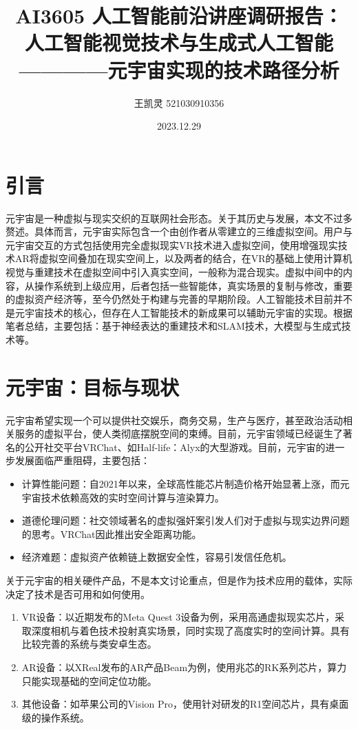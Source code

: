 \documentclass{article}
\begin{document}
	\title{AI3605 人工智能前沿讲座调研报告：
		\\人工智能视觉技术与生成式人工智能\\
		\normalsize————元宇宙实现的技术路径分析
	}
	\author{王凯灵 521030910356}
	\date{2023.12.29}
	\maketitle
	\section{引言}
	元宇宙是一种虚拟与现实交织的互联网社会形态\cite{2022s, 2022cyber}。关于其历史与发展，本文不过多赘述。具体而言，元宇宙实际包含一个由创作者从零建立的三维虚拟空间。用户与元宇宙交互的方式包括使用完全虚拟现实VR技术进入虚拟空间，使用增强现实技术AR将虚拟空间叠加在现实空间上，以及两者的结合，在VR的基础上使用计算机视觉与重建技术在虚拟空间中引入真实空间\cite{2019mixed}，一般称为混合现实。虚拟中间中的内容，从操作系统到上级应用，后者包括一些智能体，真实场景的复制与修改，重要的虚拟资产经济等，至今仍然处于构建与完善的早期阶段。人工智能技术目前并不是元宇宙技术的核心，但存在人工智能技术的新成果可以辅助元宇宙的实现\cite{2022ai}。根据笔者总结，主要包括：基于神经表达的重建技术和SLAM技术，大模型与生成式技术等。
	\section{元宇宙：目标与现状}
	元宇宙希望实现一个可以提供社交娱乐，商务交易，生产与医疗，甚至政治活动相关服务的虚拟平台，使人类彻底摆脱空间的束缚\cite{2022m, 2022ms}。目前，元宇宙领域已经诞生了著名的公开社交平台VRChat、如Half-life：Alyx的大型游戏。目前，元宇宙的进一步发展面临严重阻碍\cite{2023cha}，主要包括：
	\begin{itemize}
		\item 计算性能问题：自2021年以来，全球高性能芯片制造价格开始显著上涨，而元宇宙技术依赖高效的实时空间计算与渲染算力。
		\item 道德伦理问题：社交领域著名的虚拟强奸案引发人们对于虚拟与现实边界问题的思考。VRChat因此推出安全距离功能。
		\item 经济难题：虚拟资产依赖链上数据安全性，容易引发信任危机。
	\end{itemize}

	关于元宇宙的相关硬件产品，不是本文讨论重点，但是作为技术应用的载体，实际决定了技术是否可用和如何使用。
	\begin{enumerate}
		\item VR设备：以近期发布的Meta Quest 3设备为例，采用高通虚拟现实芯片，采取深度相机与着色技术投射真实场景，同时实现了高度实时的空间计算。具有比较完善的系统与类安卓生态。
		\item AR设备：以XReal发布的AR产品Beam为例，使用兆芯的RK系列芯片，算力只能实现基础的空间定位功能。
		\item 其他设备：如苹果公司的Vision Pro，使用针对研发的R1空间芯片，具有桌面级的操作系统。
	\end{enumerate}	
	
\end{document}
